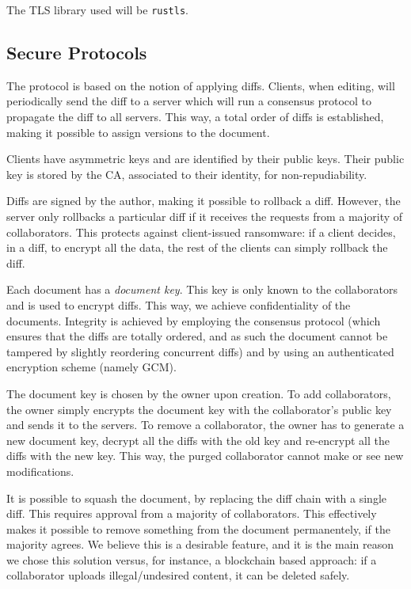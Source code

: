 The TLS library used will be \texttt{rustls}\cite{rustls}.

\subsection{Secure Protocols}

The protocol is based on the notion of applying diffs.
Clients, when editing, will periodically send the diff to a
server which will run a consensus protocol to propagate the diff
to all servers. This way, a total order of diffs is established,
making it possible to assign versions to the document.

Clients have asymmetric keys and are identified by their public
keys.
Their public key is stored by the CA, associated to their identity,
for non-repudiability.

Diffs are signed by the author, making it possible to rollback a
diff. However, the server only rollbacks a particular diff if it
receives the requests from a majority of collaborators. This
protects against client-issued ransomware: if a client decides,
in a diff, to encrypt all the data, the rest of the clients can
simply rollback the diff.

Each document has a \emph{document key}. This key is only known
to the collaborators and is used to encrypt diffs. This way, we
achieve confidentiality of the documents. Integrity is achieved
by employing the consensus protocol (which ensures that the diffs
are totally ordered, and as such the document cannot be tampered
by slightly reordering concurrent diffs) and by using an
authenticated encryption scheme (namely GCM).

The document key is chosen by the owner upon creation. To add collaborators, the owner
simply encrypts the document key with the collaborator's public
key and sends it to the servers. To remove a collaborator, the
owner has to generate a new document key, decrypt all the diffs
with the old key and re-encrypt all the diffs with the new key.
This way, the purged collaborator cannot make or see new
modifications.

It is possible to squash the document, by replacing the diff
chain with a single diff. This requires approval from a majority
of collaborators. This effectively makes it possible to remove
something from the document permanentely, if the majority agrees.
We believe this is a desirable feature, and it is the main reason
we chose this solution versus, for instance, a blockchain based
approach: if a collaborator uploads illegal/undesired content, it
can be deleted safely.

